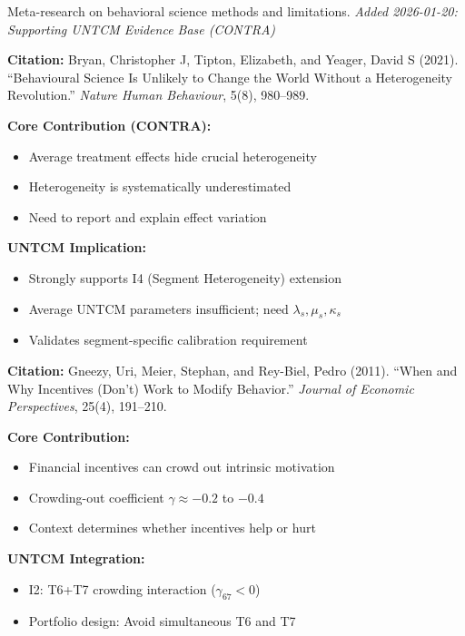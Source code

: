 Meta-research on behavioral science methods and limitations.
\textit{Added 2026-01-20: Supporting UNTCM Evidence Base (CONTRA)}

\begin{tcolorbox}[colback=orange!5!white,colframe=orange!75!black,title=CONTRA Paper: Bryan et al. (2021)]
\textbf{Citation:} Bryan, Christopher J, Tipton, Elizabeth, and Yeager, David S (2021). ``Behavioural Science Is Unlikely to Change the World Without a Heterogeneity Revolution.'' \textit{Nature Human Behaviour}, 5(8), 980--989.

\textbf{Core Contribution (CONTRA):}
\begin{itemize}[nosep]
    \item Average treatment effects hide crucial heterogeneity
    \item Heterogeneity is systematically underestimated
    \item Need to report and explain effect variation
\end{itemize}

\textbf{UNTCM Implication:}
\begin{itemize}[nosep]
    \item Strongly supports I4 (Segment Heterogeneity) extension
    \item Average UNTCM parameters insufficient; need $\lambda_s, \mu_s, \kappa_s$
    \item Validates segment-specific calibration requirement
\end{itemize}
\end{tcolorbox}

\begin{tcolorbox}[colback=yellow!5!white,colframe=yellow!75!black,title=Key Paper: Gneezy et al. (2011)]
\textbf{Citation:} Gneezy, Uri, Meier, Stephan, and Rey-Biel, Pedro (2011). ``When and Why Incentives (Don't) Work to Modify Behavior.'' \textit{Journal of Economic Perspectives}, 25(4), 191--210.

\textbf{Core Contribution:}
\begin{itemize}[nosep]
    \item Financial incentives can crowd out intrinsic motivation
    \item Crowding-out coefficient $\gamma \approx -0.2$ to $-0.4$
    \item Context determines whether incentives help or hurt
\end{itemize}

\textbf{UNTCM Integration:}
\begin{itemize}[nosep]
    \item I2: T6+T7 crowding interaction ($\gamma_{67} < 0$)
    \item Portfolio design: Avoid simultaneous T6 and T7
\end{itemize}
\end{tcolorbox}


